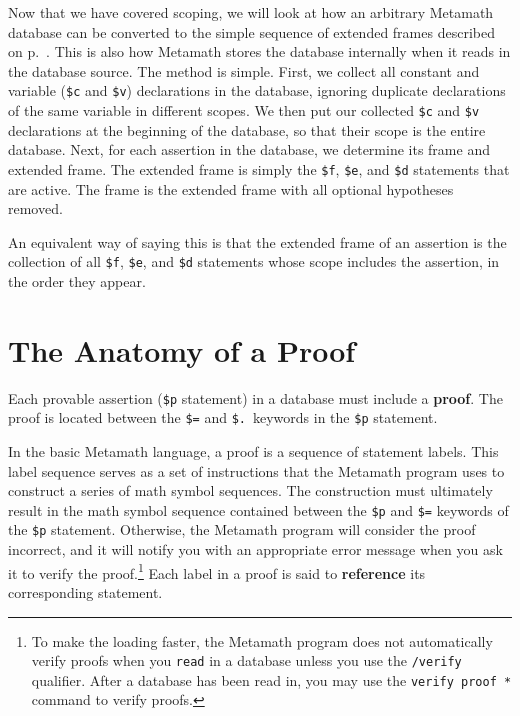 Now that we have covered scoping, we will look at how an arbitrary
Metamath database can be converted to the simple sequence of extended
frames described on p.~\pageref{framelist}.  This is also how Metamath
stores the database internally when it reads in the database
source.\label{frameconvert} The method is simple.  First, we collect all
constant and variable (\texttt{\$c} and \texttt{\$v}) declarations in
the database, ignoring duplicate declarations of the same variable in
different scopes.  We then put our collected \texttt{\$c} and
\texttt{\$v} declarations at the beginning of the database, so that
their scope is the entire database.  Next, for each assertion in the
database, we determine its frame and extended frame.  The extended frame
is simply the \texttt{\$f}, \texttt{\$e}, and \texttt{\$d} statements
that are active.  The frame is the extended frame with all optional
hypotheses removed.

An equivalent way of saying this is that the extended frame of an assertion
is the collection of all \texttt{\$f}, \texttt{\$e}, and \texttt{\$d} statements
whose scope includes the assertion, in the order they appear.


\section{The Anatomy of a Proof} \label{proof}

Each provable assertion (\texttt{\$p} statement) in a
database must include a {\bf proof}.  The proof is located
between the \texttt{\$=} and \texttt{\$.}\ keywords in the
\texttt{\$p} statement.

In the basic Metamath language, a proof is a
sequence of statement labels.  This label sequence
serves as a set of instructions that the Metamath program uses to
construct a series of math symbol sequences.  The construction must
ultimately result in the math symbol sequence contained between the
\texttt{\$p} and
\texttt{\$=} keywords of the \texttt{\$p}
statement.  Otherwise, the Metamath program will consider the proof
incorrect, and it will notify you with an appropriate error message when
you ask it to verify the proof.\footnote{To make the loading faster, the
Metamath program does not automatically verify proofs when you
\texttt{read} in a database unless you use the \texttt{/verify}
qualifier.  After a database has been read in, you may use the
\texttt{verify proof *} command to verify proofs.} Each label in a proof is said to {\bf
reference} its corresponding statement.

